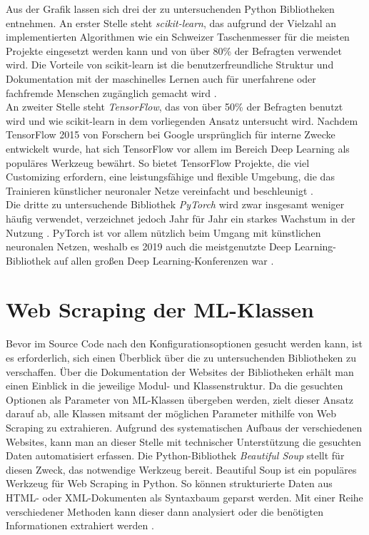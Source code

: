 \documentclass[german,bachelor]{swsLeipzig}
\begin{document}
Aus der Grafik lassen sich drei der zu untersuchenden Python Bibliotheken entnehmen.
An erster Stelle steht \textit{scikit-learn}, das aufgrund der Vielzahl an implementierten Algorithmen wie ein \glqq Schweizer Taschenmesser\grqq{}
für die meisten Projekte eingesetzt werden kann und von über 80\% der Befragten verwendet wird.
Die Vorteile von scikit-learn ist die benutzerfreundliche Struktur und Dokumentation mit der maschinelles Lernen
auch für unerfahrene oder fachfremde Menschen zugänglich gemacht wird \cite[]{10.1145/2786984.2786995}.\\
\indent An zweiter Stelle steht \textit{TensorFlow}, das von über 50\% der Befragten benutzt wird und wie scikit-learn in
dem vorliegenden Ansatz untersucht wird.
Nachdem TensorFlow 2015 von Forschern bei Google ursprünglich für interne Zwecke entwickelt wurde, hat sich TensorFlow vor allem im Bereich
Deep Learning als populäres Werkzeug bewährt.
So bietet TensorFlow Projekte, die viel Customizing erfordern, eine leistungsfähige und flexible Umgebung, die das Trainieren
künstlicher neuronaler Netze vereinfacht und beschleunigt \cite[]{doi:10.3102/1076998619872761}.\\
\indent Die dritte zu untersuchende Bibliothek \textit{PyTorch} wird zwar insgesamt weniger häufig verwendet, verzeichnet
jedoch Jahr für Jahr ein starkes Wachstum in der Nutzung \cite[]{kaggle}.
PyTorch ist vor allem nützlich beim Umgang mit künstlichen neuronalen Netzen, weshalb es 2019 auch die
meistgenutzte Deep Learning-Bibliothek auf allen großen Deep Learning-Konferenzen war \cite[]{2020}.\\


\section{Web Scraping der ML-Klassen}\label{scrape}
Bevor im Source Code nach den Konfigurationsoptionen gesucht werden kann, ist es erforderlich, sich einen Überblick über
die zu untersuchenden Bibliotheken zu verschaffen.
Über die Dokumentation der Websites der Bibliotheken erhält man einen Einblick in die jeweilige Modul- und Klassenstruktur.
Da die gesuchten Optionen als Parameter von ML-Klassen übergeben werden, zielt dieser Ansatz darauf ab, alle Klassen
mitsamt der möglichen Parameter mithilfe von Web Scraping zu extrahieren.
Aufgrund des systematischen Aufbaus der verschiedenen Websites, kann man an dieser Stelle mit technischer Unterstützung
die gesuchten Daten automatisiert erfassen.
Die Python-Bibliothek \textit{Beautiful Soup} stellt für diesen Zweck, das notwendige Werkzeug bereit.
Beautiful Soup ist ein populäres Werkzeug für Web Scraping in Python.
So können strukturierte Daten aus HTML- oder XML-Dokumenten als Syntaxbaum geparst werden.
Mit einer Reihe verschiedener Methoden kann dieser dann analysiert oder die benötigten Informationen
extrahiert werden \cite[]{richardson2007beautiful}.\\
\end{document}
